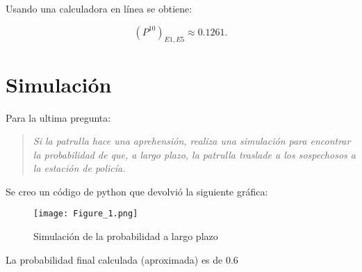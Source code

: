 \documentclass{article}
\begin{document}
Usando una calculadora en línea se obtiene:

$$
	(P^{10})_{E1,E5} \approx 0.1261.
$$

\newpage
\section*{Simulación}

Para la ultima pregunta:
\begin{quote}
	\itshape
	Si la patrulla hace una aprehensión, realiza una simulación para encontrar la probabilidad de que, a largo plazo, la patrulla traslade a los sospechosos a la estación de policía.
\end{quote}

Se creo un código de python que devolvió la siguiente gráfica:

\begin{figure}[h]
	\centering
	\texttt{[image: Figure\_1.png]}
	\caption{Simulación de la probabilidad a largo plazo}
	\label{fig:simulation}
\end{figure}

La probabilidad final calculada (aproximada) es de $0.6$
\end{document}
